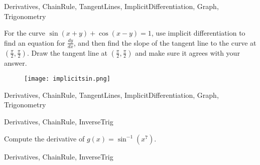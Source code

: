 	
\begin{tagblock}{Derivatives, ChainRule, TangentLines, ImplicitDifferentiation, Graph, Trigonometry}
\begin{question}
	

For the curve $\sin(x+y)+\cos(x-y) = 1$, use implicit differentiation to find an equation for $\frac{dy}{dx}$, and then find the slope of the tangent line to the curve  at $(\frac{\pi}{2},\frac{\pi}{2})$.  Draw the tangent line at $(\frac{\pi}{2},\frac{\pi}{2})$ and make sure it agrees with your answer.  

\begin{figure}[h]
\centering
\texttt{[image: implicitsin.png]}
\end{figure}



	
\begin{tags}
	    Derivatives, ChainRule, TangentLines, ImplicitDifferentiation, Graph, Trigonometry
\end{tags}
	
\begin{diary}
\end{diary}
	
\begin{solution}
	   
\end{solution}
	
\end{question}

\end{tagblock}



	
\begin{tagblock}{Derivatives, ChainRule, InverseTrig}
\begin{question}
	

Compute the derivative of $g(x) = \sin^{-1}( x^7)$.



	
\begin{tags}
	    Derivatives, ChainRule, InverseTrig
\end{tags}
	
\begin{diary}
\end{diary}
	
\begin{solution}
	   
\end{solution}
	
\end{question}

\end{tagblock}


